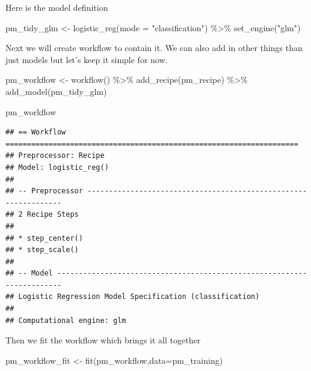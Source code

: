 \documentclass[
]{article}
\newenvironment{Shaded}{\begin{snugshade}}{\end{snugshade}}
\newcommand{\AttributeTok}[1]{\textcolor[rgb]{0.77,0.63,0.00}{#1}}
\newcommand{\FunctionTok}[1]{\textcolor[rgb]{0.00,0.00,0.00}{#1}}
\newcommand{\NormalTok}[1]{#1}
\newcommand{\OtherTok}[1]{\textcolor[rgb]{0.56,0.35,0.01}{#1}}
\newcommand{\SpecialCharTok}[1]{\textcolor[rgb]{0.00,0.00,0.00}{#1}}
\newcommand{\StringTok}[1]{\textcolor[rgb]{0.31,0.60,0.02}{#1}}
\begin{document}
Here is the model definition

\begin{Shaded}
\begin{Highlighting}[]
\NormalTok{pm\_tidy\_glm }\OtherTok{\textless{}{-}} \FunctionTok{logistic\_reg}\NormalTok{(}\AttributeTok{mode =} \StringTok{"classification"}\NormalTok{) }\SpecialCharTok{\%\textgreater{}\%}
  \FunctionTok{set\_engine}\NormalTok{(}\StringTok{"glm"}\NormalTok{) }
\end{Highlighting}
\end{Shaded}

Next we will create workflow to contain it. We can also add in other
things than just models but let's keep it simple for now.

\begin{Shaded}
\begin{Highlighting}[]
\NormalTok{pm\_workflow }\OtherTok{\textless{}{-}} \FunctionTok{workflow}\NormalTok{() }\SpecialCharTok{\%\textgreater{}\%}
  \FunctionTok{add\_recipe}\NormalTok{(pm\_recipe) }\SpecialCharTok{\%\textgreater{}\%}
  \FunctionTok{add\_model}\NormalTok{(pm\_tidy\_glm) }
\end{Highlighting}
\end{Shaded}

\begin{Shaded}
\begin{Highlighting}[]
\NormalTok{pm\_workflow}
\end{Highlighting}
\end{Shaded}

\begin{verbatim}
## == Workflow ====================================================================
## Preprocessor: Recipe
## Model: logistic_reg()
## 
## -- Preprocessor ----------------------------------------------------------------
## 2 Recipe Steps
## 
## * step_center()
## * step_scale()
## 
## -- Model -----------------------------------------------------------------------
## Logistic Regression Model Specification (classification)
## 
## Computational engine: glm
\end{verbatim}

Then we fit the workflow which brings it all together

\begin{Shaded}
\begin{Highlighting}[]
\NormalTok{pm\_workflow\_fit }\OtherTok{\textless{}{-}} \FunctionTok{fit}\NormalTok{(pm\_workflow,}\AttributeTok{data=}\NormalTok{pm\_training)}
\end{Highlighting}
\end{Shaded}
\end{document}

